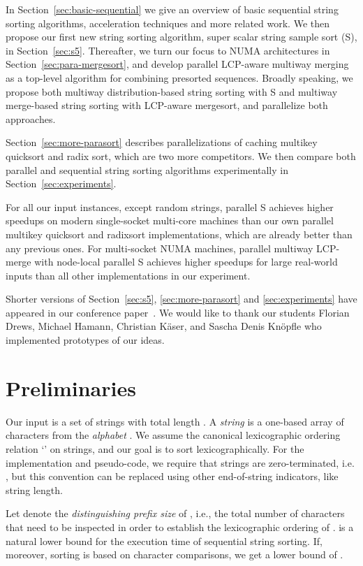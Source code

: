 \documentclass[a4paper]{myjournal}
\begin{document}
In Section~\ref{sec:basic-sequential} we give an overview of basic sequential
string sorting algorithms, acceleration techniques and more related work. We
then propose our first new string sorting algorithm, super scalar string sample
sort (S), in Section~\ref{sec:s5}. Thereafter, we turn our focus to NUMA
architectures in Section~\ref{sec:para-mergesort}, and develop parallel
LCP-aware multiway merging as a top-level algorithm for combining presorted
sequences. Broadly speaking, we propose both multiway distribution-based string
sorting with S and multiway merge-based string sorting with LCP-aware
mergesort, and parallelize both approaches.

Section~\ref{sec:more-parasort} describes parallelizations of caching multikey
quicksort and radix sort, which are two more competitors. We then compare both
parallel and sequential string sorting algorithms experimentally in
Section~\ref{sec:experiments}.

For all our input instances, except random strings, parallel S achieves
higher speedups on modern single-socket multi-core machines than our own
parallel multikey quicksort and radixsort implementations, which are already
better than any previous ones. For multi-socket NUMA machines, parallel multiway
LCP-merge with node-local parallel S achieves higher speedups for large
real-world inputs than all other implementations in our experiment.

Shorter versions of Section~\ref{sec:s5}, \ref{sec:more-parasort} and
\ref{sec:experiments} have appeared in our conference
paper~\cite{bingmann2013parallel}.  We would like to thank our students Florian
Drews, Michael Hamann, Christian Käser, and Sascha Denis Knöpfle who implemented
prototypes of our ideas.

\section{Preliminaries}\label{sec:prelim}

Our input is a set  of  strings with total
length .  A \emph{string}  is a one-based array of  characters from
the \emph{alphabet} .  We assume the canonical
lexicographic ordering relation `' on strings, and our goal is to sort
 lexicographically.  For the implementation and pseudo-code, we
require that strings are zero-terminated, i.e. , but
this convention can be replaced using other end-of-string indicators, like
string length.

Let  denote the \emph{distinguishing prefix size} of , i.e., the
total number of characters that need to be inspected in order to establish the
lexicographic ordering of .  is a natural lower bound for the
execution time of sequential string sorting. If, moreover, sorting is based on
character comparisons, we get a lower bound of .
\end{document}
